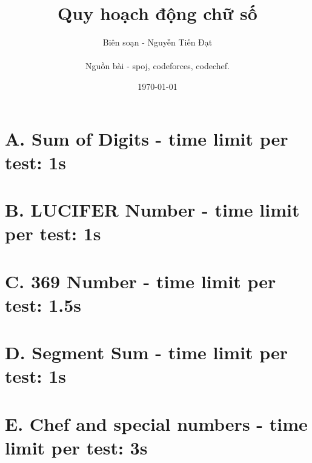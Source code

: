 \documentclass[a4paper,17pt]{article}
\title{Quy hoạch động chữ số}
\author{
    Biên soạn - Nguyễn Tiến Đạt \\ \\
    Nguồn bài - spoj, codeforces, codechef.
}
\date{\today}
\begin{document}
    \maketitle
    \newpage
    \tableofcontents
    \newpage
    \section{\textbf{A. Sum of Digits - time limit per test: 1s}}
        
    \section{\textbf{B. LUCIFER Number - time limit per test: 1s}}
        
    \section{\textbf{C. 369 Number - time limit per test: 1.5s}}
        
    \section{\textbf{D. Segment Sum - time limit per test: 1s}}
        
    \section{\textbf{E. Chef and special numbers - time limit per test: 3s}}
        
\end{document}
